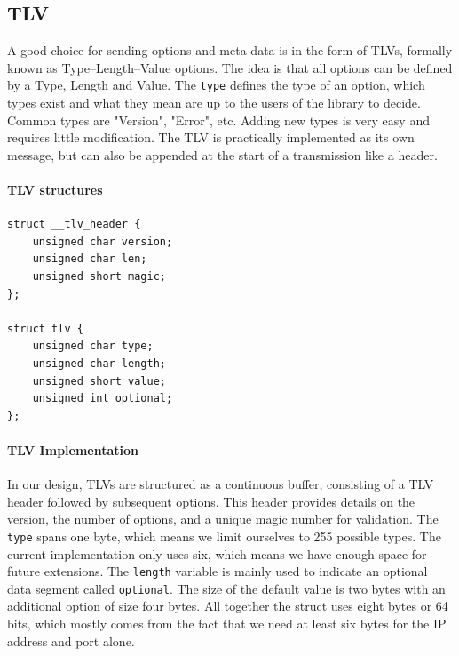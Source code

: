 \documentclass[a4paper,english, 12pt]{report}
\begin{document}
\subsection{TLV}
A good choice for sending options and meta-data is in the form of TLVs, formally known as Type–Length–Value options.
The idea is that all options can be defined by a Type, Length and Value. The \verb|type| defines the type of an option, which types exist and what they mean are up to the users of the library to decide. Common types are "Version", "Error", etc. Adding new types is very easy and requires little modification. The TLV is practically implemented as its own message, but can also be appended at the start of a transmission like a header.\\

\noindent\begin{minipage}{\linewidth}
\paragraph{TLV structures}
\begin{verbatim}
struct __tlv_header {
    unsigned char version;
    unsigned char len;
    unsigned short magic;
};

struct tlv {
    unsigned char type;
    unsigned char length;
    unsigned short value;
    unsigned int optional;
};
\end{verbatim}
\end{minipage}

\paragraph{TLV Implementation}
In our design, TLVs are structured as a continuous buffer, consisting of a TLV header followed by subsequent options.  This header provides details on the version, the number of options, and a unique magic number for validation. The \verb|type| spans one byte, which means we limit ourselves to 255 possible types. The current implementation only uses six, which means we have enough space for future extensions. The \verb|length| variable is mainly used to indicate an optional data segment called \verb|optional|. The size of the default value is two bytes with an additional option of size four bytes. All together the struct uses eight bytes or 64 bits, which mostly comes from the fact that we need at least six bytes for the IP address and port alone. 
\end{document}
